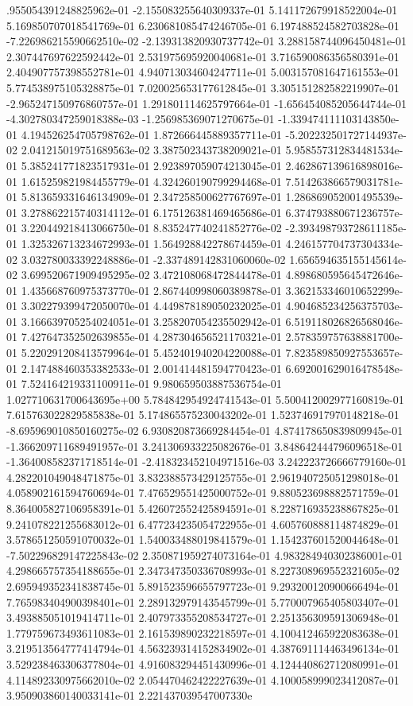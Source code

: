 .955054391248825962e-01	-2.155083255640309337e-01	5.141172679918522004e-01	5.169850707018541769e-01	6.230681085474246705e-01	6.197488524582703828e-01	-7.226986215590662510e-02	-2.139313820930737742e-01	3.288158744096450481e-01	2.307447697622592442e-01	2.531975695920040681e-01	3.716590086356580391e-01	2.404907757398552781e-01	4.940713034604247711e-01	5.003157081647161553e-01	5.774538975105328875e-01	7.020025653177612845e-01	3.305151282582219907e-01	-2.965247150976860757e-01	1.291801114625797664e-01	-1.656454085205644744e-01	-4.302780347259018388e-03	-1.256985369071270675e-01	-1.339474111103143850e-01	4.194526254705798762e-01	1.872666445889357711e-01	-5.202232501727144937e-02	2.041215019751689563e-02	3.387502343738209021e-01	5.958557312834481534e-01	5.385241771823517931e-01	2.923897059074213045e-01	2.462867139616898016e-01	1.615259821984455779e-01	4.324260190799294468e-01	7.514263866579031781e-01	5.813659331646134909e-01	2.347258500627767697e-01	1.286869052001495539e-01	3.278862215740314112e-01	6.175126381469465686e-01	6.374793880671236757e-01	3.220449218413066750e-01	8.835247740241852776e-02	-2.393498793728611185e-01	1.325326713234672993e-01	1.564928842278674459e-01	4.246157704737304334e-02	3.032780033392248886e-01	-2.337489142831060060e-02	1.656594635155145614e-02	3.699520671909495295e-02	3.472108068472844478e-01	4.898680595645472646e-01	1.435668760975373770e-01	2.867440998060389878e-01	3.362153346010652299e-01	3.302279399472050070e-01	4.449878189050232025e-01	4.904685234256375703e-01	3.166639705254024051e-01	3.258207054235502942e-01	6.519118026826568046e-01	7.427647352502639855e-01	4.287304656521170321e-01	2.578359757638881700e-01	5.220291208413579964e-01	5.452401940204220088e-01	7.823589850927553657e-01	2.147488460353382533e-01	2.001414481594770423e-01	6.692001629016478548e-01	7.524164219331100911e-01	9.980659503887536754e-01	1.027710631700643695e+00	5.784842954924741543e-01	5.500412002977160819e-01	7.615763022829585838e-01	5.174865575230043202e-01	1.523746917970148218e-01	-8.695969010850160275e-02	6.930820873669284454e-01	4.874178650839809945e-01	-1.366209711689491957e-01	3.241306933225082676e-01	3.848642444796096518e-01	-1.364008582371718514e-01	-2.418323452104971516e-03	3.242223726666779160e-01	4.282201049048471875e-01	3.832388573429125755e-01	2.961940725051298018e-01	4.058902161594760694e-01	7.476529551425000752e-01	9.880523698882571759e-01	8.364005827106958391e-01	5.426072552425894591e-01	8.228716935238867825e-01	9.241078221255683012e-01	6.477234235054722955e-01	4.605760888114874829e-01	3.578651250591070032e-01	1.540033488019841579e-01	1.154237601520044648e-01	-7.502296829147225843e-02	2.350871959274073164e-01	4.983284940302386001e-01	4.298665757354188655e-01	2.347347350336708993e-01	8.227308969552321605e-02	2.695949352341838745e-01	5.891523596655797723e-01	9.293200120900666494e-01	7.765983404900398401e-01	2.289132979143545799e-01	5.770007965405803407e-01	3.493885051019414711e-01	2.407973355208534727e-01	2.251356309591306948e-01	1.779759673493611083e-01	2.161539890232218597e-01	4.100412465922083638e-01	3.219513564777414794e-01	4.563239314152834902e-01	4.387691114463496134e-01	3.529238463306377804e-01	4.916083294451430996e-01	4.124440862712080991e-01	4.114892330975662010e-02	2.054470462422227639e-01	4.100058999023412087e-01	3.950903860140033141e-01	2.221437039547007330e